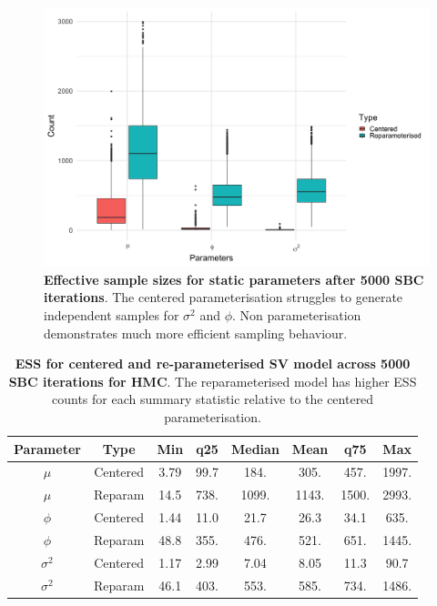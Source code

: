 \documentclass[12pt, a4paper]{article}
\begin{document}
    \begin{figure}[H]
        \centering
        \includegraphics[scale=0.09]{results/hmc_ess.png}
        \caption{\textbf{Effective sample sizes for static parameters after 5000 SBC iterations}. The centered parameterisation struggles to generate independent samples for $\sigma^2$ and $\phi$. Non parameterisation demonstrates much more efficient sampling behaviour.}
        \label{fig:hmcess}
    \end{figure}

    \begin{table}[H]
        \centering
        \begin{tabular}{|c|c|c|c|c|c|c|c|} \hline 
        Parameter &  Type&Min& q25&  Median& Mean & q75&Max\\ \hline 
        $\mu$&  Centered&3.79 & 99.7 & 184. & 305. & 457. & 1997.  \\
     $\mu$&  Reparam&14.5 & 738. & 1099. & 1143. & 1500. & 2993.  \\\hline 
     $\phi$&  Centered&1.44 & 11.0 & 21.7 & 26.3 & 34.1 & 635.  \\
     $\phi$&  Reparam&48.8 & 355. & 476. & 521. & 651. & 1445.   \\ \hline 
     $\sigma^2$&  Centered& 1.17 & 2.99 & 7.04 & 8.05 & 11.3 & 90.7 \\ 
     $\sigma^2$&  Reparam&46.1 & 403. & 553. & 585. & 734. & 1486. \\ \hline
        \end{tabular}
        \caption{\textbf{ESS for centered and re-parameterised SV model across 5000 SBC iterations for HMC}. The reparameterised model has higher ESS counts for each summary statistic relative to the centered parameterisation.}
        \label{tab:hmcess}
    \end{table}
\end{document}
